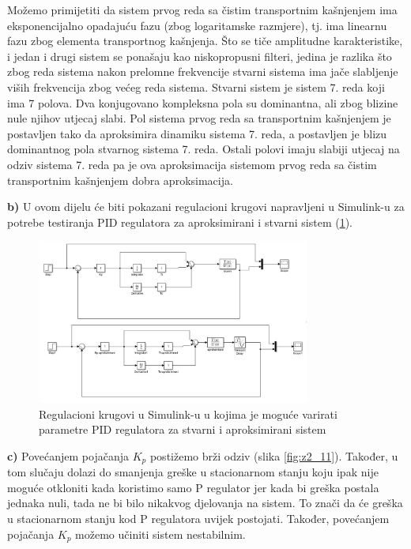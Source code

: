 Možemo primijetiti da sistem prvog reda sa čistim transportnim kašnjenjem ima eksponencijalno opadajuću fazu (zbog logaritamske razmjere), tj. ima linearnu fazu zbog elementa transportnog kašnjenja. Što se tiče amplitudne karakteristike, i jedan i drugi sistem se ponašaju kao niskopropusni filteri, jedina je razlika što zbog reda sistema nakon prelomne frekvencije stvarni sistema ima jače slabljenje viših frekvencija zbog većeg reda sistema. Stvarni sistem je sistem 7. reda koji ima 7 polova. Dva konjugovano kompleksna pola su dominantna, ali zbog blizine nule njihov utjecaj slabi. Pol sistema prvog reda sa transportnim kašnjenjem je postavljen tako da aproksimira dinamiku sistema 7. reda, a postavljen je blizu dominantnog pola stvarnog sistema 7. reda.
Ostali polovi imaju slabiji utjecaj na odziv sistema 7. reda pa je ova aproksimacija sistemom prvog reda sa čistim transportnim kašnjenjem dobra aproksimacija.

\textbf{b)} U ovom dijelu će biti pokazani regulacioni krugovi napravljeni u Simulink-u za potrebe testiranja PID regulatora za aproksimirani i stvarni sistem (\ref{fig:z2_10}).
 
 \begin{figure} [H]
  \centering
  \includegraphics[width=0.8\textwidth]{z2_10}
  \caption{Regulacioni krugovi u Simulink-u u kojima je moguće varirati parametre PID regulatora za stvarni i aproksimirani sistem}
  \label{fig:z2_10}
\end{figure}


\textbf{c)} Povećanjem pojačanja $K_p$ postižemo brži odziv (slika \ref{fig:z2_11}). Također, u tom slučaju dolazi do smanjenja greške u stacionarnom stanju koju ipak nije moguće otkloniti kada koristimo samo P regulator jer kada bi greška postala jednaka nuli, tada ne bi bilo nikakvog djelovanja na sistem. To znači da će greška u stacionarnom stanju kod P regulatora uvijek postojati. Također, povećanjem pojačanja $K_p$ možemo učiniti sistem nestabilnim.

